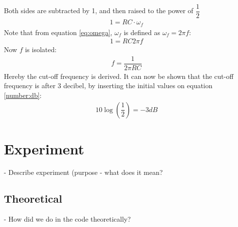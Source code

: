 Both sides are subtracted by 1, and then raised to the power of $\dfrac{1}{2}$
\begin{align*}
1 = RC \cdot \omega_f 
\end{align*}
Note that from equation \eqref{eq:omega}, $\omega_f$ is defined as $\omega_f=2 \pi f$:
\begin{align*}
1 = RC 2\pi f 
\end{align*}
Now $f$ is isolated:
\begin{align*}
f=\dfrac{1}{2\pi RC}
\end{align*}
Hereby the cut-off frequency is derived. It can now be shown that the cut-off frequency is after 3 decibel, by inserting the initial values on equation \eqref{number:db}:
\begin{align*}
10 \log \left(\dfrac{1}{2} \right) = -3 dB
\end{align*}
\section{Experiment} \label{experiment}
- Describe experiment (purpose - what does it mean?
\subsection{Theoretical}
- How did we do in the code theoretically?
